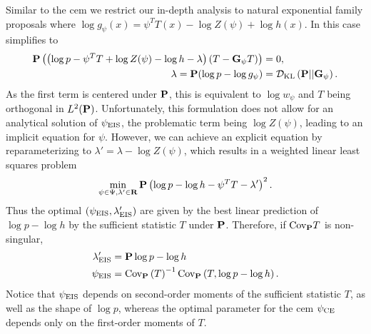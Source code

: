 Similar to the \gls{cem} we restrict our in-depth analysis to natural exponential family proposals where $\log g_{\psi}(x) = \psi^{T}T(x) - \log Z(\psi) + \log h(x)$. In this case  simplifies to
\begin{align*}
    \P \left(\left( \log p - \psi^{T}T + \log Z(\psi) - \log h - \lambda \right)(T - \G_{\psi} T)\right) &= 0,\\
    \lambda = \P (\log p - \log g_{\psi}) &= \Dkl{\P}{\G_{\psi}}.
\end{align*}
As the first term is centered under $\P$, this is equivalent to $\log w_{\psi}$ and $T$ being orthogonal in $L^{2}(\P)$. 
Unfortunately, this formulation does not allow for an analytical solution of $\peis$, the problematic term being $\log Z(\psi)$, leading to an implicit equation for $\psi$. However, we can achieve an explicit equation by reparameterizing to $\lambda' = \lambda - \log Z(\psi)$, which results in a weighted linear least squares problem
\begin{align*}
    \min_{\psi \in \Psi, \lambda' \in \R} \P \left(\log p - \log h - \psi^{T}T - \lambda'\right)^{2}.
\end{align*}
Thus the optimal $ \left( \peis, \lambda'_{\text{EIS}} \right)$ are given by the best linear prediction of $\log p - \log h$ by the sufficient statistic $T$ under $\P$. Therefore, if $\cov_{\P} T$ is non-singular, 
\begin{align}
    \lambda'_{\text{EIS}} &= \P \log p - \log h \nonumber{}\\
    \label{eq:peis-analytical}
    \peis &= \cov_{\P} \left( T \right)^{-1} \cov_{\P} \left(T, \log p - \log h \right).
\end{align}
Notice that $\peis$ depends on second-order moments of the sufficient statistic $T$, as well as the shape of $\log p$, whereas the optimal parameter for the \gls{cem} $\pce$ depends only on the first-order moments of $T$. 

